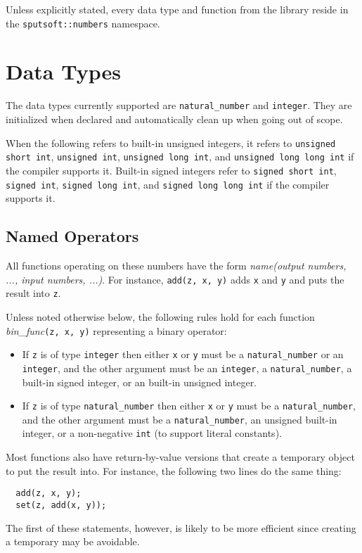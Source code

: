 \documentclass[a4paper]{article}
\begin{document}
Unless explicitly stated, every data type and function from the library reside in the \texttt{sputsoft::numbers} namespace.


\section{Data Types}

The data types currently supported are \texttt{natural\_number} and \texttt{integer}. They are initialized when declared and automatically clean up when going out of scope.

When the following refers to built-in unsigned integers, it refers to \texttt{unsigned short int}, \texttt{unsigned int}, \texttt{unsigned long int}, and \texttt{unsigned long long int} if the compiler supports it. Built-in signed integers refer to \texttt{signed short int}, \texttt{signed int}, \texttt{signed long int}, and \texttt{signed long long int} if the compiler supports it.

\subsection{Named Operators}

All functions operating on these numbers have the form \emph{name(output numbers, ..., input numbers, ...)}. For instance, \texttt{add(z, x, y)} adds \texttt{x} and \texttt{y} and puts the result into \texttt{z}.

Unless noted otherwise below, the following rules hold for each function \emph{bin\_func}\texttt{(z, x, y)} representing a binary operator:
\begin{itemize}
\item If \texttt{z} is of type \texttt{integer} then either \texttt{x} or \texttt{y} must be a \texttt{natural\_number} or an \texttt{integer}, and the other argument must be an \texttt{integer}, a \texttt{natural\_number}, a built-in signed integer, or an built-in unsigned integer.
\item If \texttt{z} is of type \texttt{natural\_number} then either \texttt{x} or \texttt{y} must be a \texttt{natural\_number}, and the other argument must be a \texttt{natural\_number}, an unsigned built-in integer, or a non-negative \texttt{int} (to support literal constants).
\end{itemize}

Most functions also have return-by-value versions that create a temporary object to put the result into. For instance, the following two lines do the same thing:
\begin{verbatim}
  add(z, x, y);
  set(z, add(x, y));
\end{verbatim}
The first of these statements, however, is likely to be more efficient since creating a temporary may be avoidable.
\end{document}
